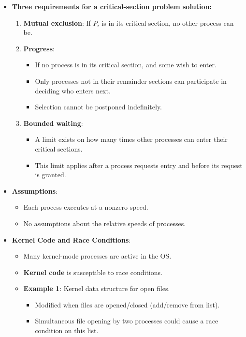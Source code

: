 \begin{itemize}
\begin{verbatim}
}
\end{verbatim}
    \item \textbf{Three requirements for a critical-section problem solution:}
    \begin{enumerate}
        \item \textbf{Mutual exclusion}: If $P_i$ is in its critical section, no other process can be.
        \item \textbf{Progress}:
        \begin{itemize}
            \item If no process is in its critical section, and some wish to enter.
            \item Only processes not in their remainder sections can participate in deciding who enters next.
            \item Selection cannot be postponed indefinitely.
        \end{itemize}
        \item \textbf{Bounded waiting}:
        \begin{itemize}
            \item A limit exists on how many times other processes can enter their critical sections.
            \item This limit applies after a process requests entry and before its request is granted.
        \end{itemize}
    \end{enumerate}
    \item \textbf{Assumptions}:
    \begin{itemize}
        \item Each process executes at a nonzero speed.
        \item No assumptions about the relative speeds of processes.
    \end{itemize}
    \item \textbf{Kernel Code and Race Conditions}:
    \begin{itemize}
        \item Many kernel-mode processes are active in the OS.
        \item \textbf{Kernel code} is susceptible to race conditions.
        \item \textbf{Example 1}: Kernel data structure for open files.
        \begin{itemize}
            \item Modified when files are opened/closed (add/remove from list).
            \item Simultaneous file opening by two processes could cause a race condition on this list.

\end{itemize}
\end{itemize}
\end{itemize}
